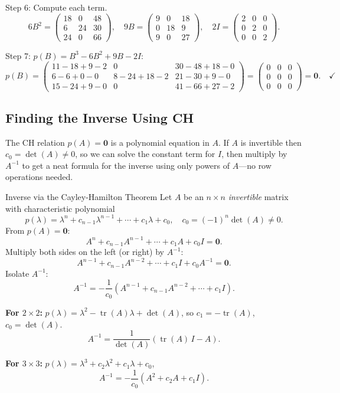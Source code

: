 \documentclass[12pt,a4paper]{article}
\begin{document}
Step 6: Compute each term.
\[
  6B^{2} = \begin{pmatrix}18&0&48\\6&24&30\\24&0&66\end{pmatrix}, \quad
  9B = \begin{pmatrix}9&0&18\\0&18&9\\9&0&27\end{pmatrix}, \quad
  2I = \begin{pmatrix}2&0&0\\0&2&0\\0&0&2\end{pmatrix}.
\]

Step 7: $p(B) = B^{3} - 6B^{2} + 9B - 2I$:
\[
  p(B) = \begin{pmatrix}11-18+9-2&0&30-48+18-0\\6-6+0-0&8-24+18-2&21-30+9-0\\15-24+9-0&0&41-66+27-2\end{pmatrix}
        = \begin{pmatrix}0&0&0\\0&0&0\\0&0&0\end{pmatrix} = \mathbf{0}. \quad \checkmark
\]

\subsection{Finding the Inverse Using CH}

The CH relation $p(A) = \mathbf{0}$ is a polynomial equation in $A$.
If $A$ is invertible then $c_{0} = \det(A) \neq 0$, so we can solve the
constant term for $I$, then multiply by $A^{-1}$ to get a neat formula for
the inverse using only powers of $A$---no row operations needed.

\begin{infobox}{Inverse via the Cayley-Hamilton Theorem}
Let $A$ be an $n\times n$ \emph{invertible} matrix with characteristic polynomial
\[
  p(\lambda) = \lambda^{n} + c_{n-1}\lambda^{n-1} + \cdots + c_{1}\lambda + c_{0},
  \quad c_{0} = (-1)^{n}\det(A) \neq 0.
\]
From $p(A) = \mathbf{0}$:
\[
  A^{n} + c_{n-1}A^{n-1} + \cdots + c_{1}A + c_{0}I = \mathbf{0}.
\]
Multiply both sides on the left (or right) by $A^{-1}$:
\[
  A^{n-1} + c_{n-1}A^{n-2} + \cdots + c_{1}I + c_{0}A^{-1} = \mathbf{0}.
\]
Isolate $A^{-1}$:
\[
  \boxed{A^{-1} = -\frac{1}{c_{0}}\!\left(A^{n-1} + c_{n-1}A^{n-2} + \cdots + c_{1}I\right).}
\]

\textbf{For $2\times2$:}
$p(\lambda) = \lambda^{2} - \operatorname{tr}(A)\lambda + \det(A)$,
so $c_{1} = -\operatorname{tr}(A)$, $c_{0} = \det(A)$.
\[
  A^{-1} = \frac{1}{\det(A)}\!\left(\operatorname{tr}(A)\,I - A\right).
\]

\textbf{For $3\times3$:}
$p(\lambda) = \lambda^{3} + c_{2}\lambda^{2} + c_{1}\lambda + c_{0}$,
\[
  A^{-1} = -\frac{1}{c_{0}}\!\left(A^{2} + c_{2}A + c_{1}I\right).
\]
\end{infobox}
\end{document}
